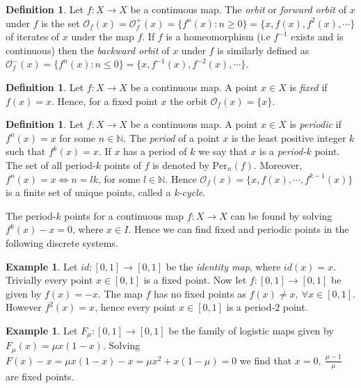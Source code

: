 \documentclass[11pt,a4paper,oneside]{memoir}
\theoremstyle{plain}
\theoremstyle{definition}
\newtheorem{defn}[thm]{Definition}
\newtheorem{exmp}[thm]{Example}
\begin{document}
\begin{defn}
    Let $f: X \to X$ be a continuous map. The \emph{orbit} or \emph{forward orbit} of $x$ under $f$ is the set $\mathcal{O}_f(x) = \mathcal{O}^+_f(x) = \lbrace f^n(x) : n \geq 0 \rbrace = \lbrace x, f(x), f^2(x), \cdots \rbrace$ of iterates of $x$ under the map $f$. If $f$ is a homeomorphism (i.e $f^{-1}$ exists and is continuous) then the \emph{backward orbit} of $x$ under $f$ is similarly defined as $\mathcal{O}^-_f(x) = \lbrace f^n(x) : n \leq 0 \rbrace = \lbrace x, f^{-1}(x), f^{-2}(x), \cdots \rbrace$.
\end{defn}

\begin{defn}
    Let $f: X \to X$ be a continuous map. A point $x \in X$ is \emph{fixed} if $f(x) = x$. Hence, for a fixed point $x$ the orbit $\mathcal{O}_f(x) = \lbrace x \rbrace$.
\end{defn}

\begin{defn}
    Let $f: X \to X$ be a continuous map. A point $x \in X$ is \emph{periodic} if $f^n(x) = x$ for some $n \in \mathbb{N}$. The \emph{period} of a point $x$ is the least positive integer $k$ such that $f^k(x) = x$. If $x$ has a period of $k$ we say that $x$ is a \emph{period-$k$} point. The set of all period-$k$ points of $f$ is denoted by $\text{Per}_n(f)$. Moreover, $f^n(x) = x \iff n = lk$, for some $l \in \mathbb{N}$. Hence $\mathcal{O}_f(x) = \lbrace x, f(x), \cdots, f^{k-1}(x) \rbrace$ is a finite set of unique points, called a \emph{k-cycle}.
\end{defn}

The period-$k$ points for a continuous map $f: X \to X$ can be found by solving $f^k(x) - x = 0$, where $x \in I$. Hence we can find fixed and periodic points in the following discrete systems.

\begin{exmp}
    Let $id: [0, 1] \to [0, 1]$ be the \emph{identity map}, where $id(x) = x$. Trivially every point $x \in [0, 1]$ is a fixed point. Now let $f: [0, 1] \to [0, 1]$ be given by $f(x) = -x$. The map $f$ has no fixed points as $f(x) \neq x, \ \forall x \in [0, 1]$. However $f^2(x) = x$, hence every point $x \in [0, 1]$ is a period-$2$ point.
\end{exmp}

\begin{exmp}
    Let $F_{\mu} : [0, 1] \to [0, 1]$ be the family of logistic maps given by $F_{\mu}(x) = \mu x (1-x)$. Solving $F(x) - x = \mu x (1 - x) - x = \mu x^{2} + x (1 - \mu) = 0$ we find that $x = 0, \ \frac{\mu - 1}{\mu}$ are fixed points.
\end{exmp}
\end{document}
